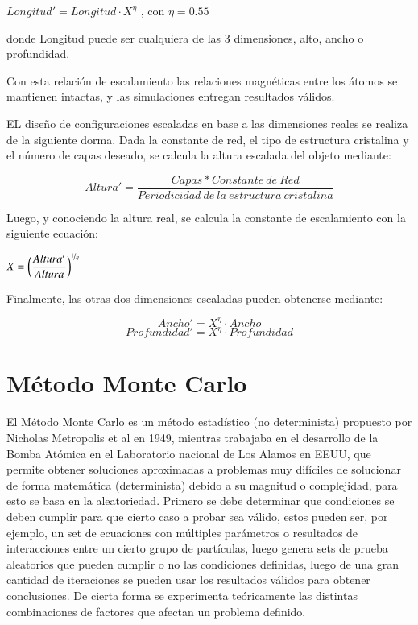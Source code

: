 \begin{center}
$Longitud' = Longitud \cdot X ^ \eta$ , con $\eta = 0.55$
\end{center}

\noindent
donde Longitud puede ser cualquiera de las 3 dimensiones, alto, ancho o profundidad.

Con esta relación de escalamiento las relaciones magnéticas entre los átomos se mantienen intactas, y las simulaciones entregan resultados válidos.

EL diseño de configuraciones escaladas en base a las dimensiones reales se realiza de la siguiente dorma. Dada la constante de red, el tipo de estructura cristalina y el número de capas deseado, se calcula la altura escalada del objeto mediante:

\begin{center}
    $$Altura' = \dfrac{Capas * Constante\ de\ Red}{Periodicidad\ de\ la\ estructura\ cristalina}$$
\end{center}

Luego, y conociendo la altura real, se calcula la constante de escalamiento con la siguiente ecuación:

\begin{center}
$X = \bigg( \dfrac{Altura'}{Altura} \bigg)^{\nicefrac{1}{\eta}}$
\end{center}

Finalmente, las otras dos dimensiones escaladas pueden obtenerse mediante:

\begin{center}
$$Ancho' = X^\eta \cdot Ancho$$
$$Profundidad' = X^\eta \cdot Profundidad$$
\end{center}

\section{Método Monte Carlo}

El Método Monte Carlo es un método estadístico (no determinista) propuesto por Nicholas Metropolis et al en 1949, mientras trabajaba en el desarrollo de la Bomba Atómica en el Laboratorio nacional de Los Alamos en EEUU, que permite obtener soluciones aproximadas a problemas muy difíciles de solucionar de forma matemática (determinista) debido a su magnitud o complejidad, para esto se basa en la aleatoriedad. Primero se debe determinar que condiciones se deben cumplir para que cierto caso a probar sea válido, estos pueden ser, por ejemplo, un set de ecuaciones con múltiples parámetros o resultados de interacciones entre un cierto grupo de partículas, luego genera sets de prueba aleatorios que pueden cumplir o no las condiciones definidas, luego de una gran cantidad de iteraciones se pueden usar los resultados válidos para obtener conclusiones. De cierta forma se experimenta teóricamente las distintas combinaciones de factores que afectan un problema definido.

